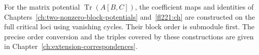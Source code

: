 For the matrix potential $\operatorname{Tr}(A[B,C])$, the coefficient maps
and identities of Chapters~\ref{ch:two-nonzero-block-potentials}
and~\ref{fl221:ch} are constructed on the full critical loci using
vanishing cycles. Their block order is submodule first. The precise order
conversion and the triples covered by these constructions are given in
Chapter~\ref{ch:extension-correspondences}.
